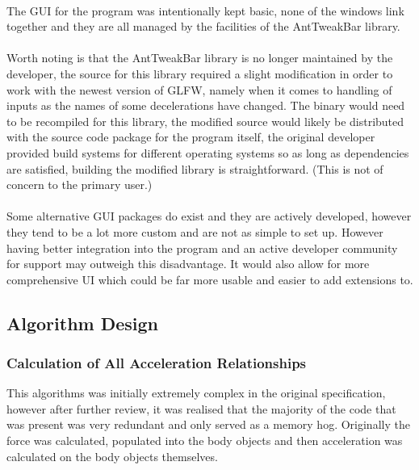 \paragraph{}
The GUI for the program was intentionally kept basic, none of the windows link together and they are all managed by the facilities of the AntTweakBar library.

\paragraph{}
Worth noting is that the AntTweakBar library is no longer maintained by the developer, the source for this library required a slight modification in order to work with the newest version of GLFW, namely when it comes to handling of inputs as the names of some decelerations have changed. The binary would need to be recompiled for this library, the modified source would likely be distributed with the source code package for the program itself, the original developer provided build systems for different operating systems so as long as dependencies are satisfied, building the modified library is straightforward. (This is not of concern to the primary user.)

\paragraph{}
Some alternative GUI packages do exist and they are actively developed, however they tend to be a lot more custom and are not as simple to set up. However having better integration into the program and an active developer community for support may outweigh this disadvantage. It would also allow for more comprehensive UI which could be far more usable and easier to add extensions to.
\pagebreak

\subsection{Algorithm Design}
\subsubsection{Calculation of All Acceleration Relationships}
This algorithms was initially extremely complex in the original specification, however after further review, it was realised that the majority of the code that was present was very redundant and only served as a memory hog. Originally the force was calculated, populated into the body objects and then acceleration was calculated on the body objects themselves.


